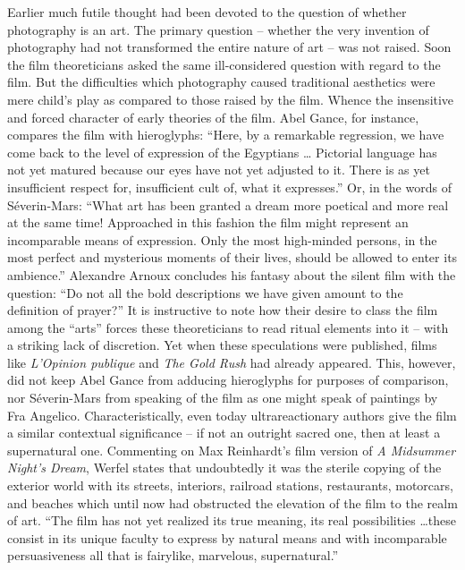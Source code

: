 \documentclass[11pt, letterpaper]{article}
\begin{document}
Earlier much futile thought had been devoted to the question of whether
photography is an art. The primary question – whether the very invention of
photography had not transformed the entire nature of art – was not raised. Soon
the film theoreticians asked the same ill-considered question with regard to
the film. But the difficulties which photography caused traditional aesthetics
were mere child’s play as compared to those raised by the film. Whence the
insensitive and forced character of early theories of the film. Abel Gance, for
instance, compares the film with hieroglyphs: “Here, by a remarkable
regression, we have come back to the level of expression of the Egyptians \ldots
Pictorial language has not yet matured because our eyes have not yet adjusted
to it. There is as yet insufficient respect for, insufficient cult of, what it
expresses.” Or, in the words of Séverin-Mars: “What art has been granted a
dream more poetical and more real at the same time! Approached in this fashion
the film might represent an incomparable means of expression. Only the most
high-minded persons, in the most perfect and mysterious moments of their lives,
should be allowed to enter its ambience.” Alexandre Arnoux concludes his
fantasy about the silent film with the question: “Do not all the bold
descriptions we have given amount to the definition of prayer?” It is
instructive to note how their desire to class the film among the “arts” forces
these theoreticians to read ritual elements into it – with a striking lack of
discretion. Yet when these speculations were published, films like
\textit{L’Opinion publique} and \textit{The Gold Rush} had already appeared.
This, however, did not keep Abel Gance from adducing hieroglyphs for purposes
of comparison, nor Séverin-Mars from speaking of the film as one might speak of
paintings by Fra Angelico. Characteristically, even today ultrareactionary
authors give the film a similar contextual significance – if not an outright
sacred one, then at least a supernatural one. Commenting on Max Reinhardt’s
film version of \textit{A Midsummer Night’s Dream}, Werfel states that
undoubtedly it was the sterile copying of the exterior world with its streets,
interiors, railroad stations, restaurants, motorcars, and beaches which until
now had obstructed the elevation of the film to the realm of art. “The film has
not yet realized its true meaning, its real possibilities \ldots these consist in
its unique faculty to express by natural means and with incomparable
persuasiveness all that is fairylike, marvelous, supernatural.”
\end{document}
